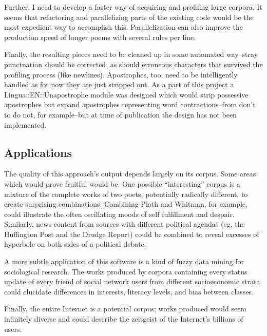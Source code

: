 \documentclass[10pt]{article}
\begin{document}
Further, I need to develop a faster way of acquiring and
profiling large corpora. It seems that refactoring and parallelizing parts of
the existing code would be the most expedient way to accomplish this.
Parallelization can also improve the production speed of longer poems with
several rules per line.

Finally, the resulting pieces need to be cleaned up in some automated
way--stray punctuation should be corrected, as should erroneous characters that
survived the profiling process (like newlines). Apostrophes, too, need to be
intelligently handled as for now they are just stripped out. As a part of this
project a Lingua::EN::Unapostrophe module was designed which would strip
possessive apostrophes but expand apostrophes representing word
contractions--from don't to do not, for example--but at time of publication the
design has not been implemented.

\subsection{Applications}
The quality of this approach's output depends largely on its corpus. Some areas
which would prove fruitful would be. One possible ``interesting'' corpus is a
mixture of the complete works of two poets, potentially radically different, to
create surprising combinations. Combining Plath and Whitman, for example, could
illustrate the often oscillating moods of self fulfillment and despair.
Similarly, news content from sources with different political agendas (eg, the
Huffington Post and the Drudge Report) could be combined to reveal excesses of
hyperbole on both sides of a political debate.

A more subtle application of this software is a kind of fuzzy data mining for
sociological research. The works produced by corpora containing every status
update of every friend of social network users from different socioeconomic
strata could elucidate differences in interests, literacy levels, and bias
between classes.

Finally, the entire Internet is a potential corpus; works
produced would seem infinitely diverse and could describe the zeitgeist of the
Internet's billions of users.



\end{document}
